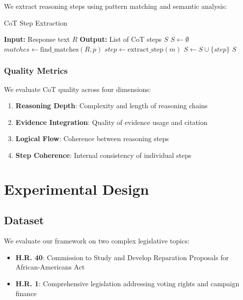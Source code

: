 \documentclass[11pt]{article}
\begin{document}
We extract reasoning steps using pattern matching and semantic analysis:

\begin{algorithm}
\caption{CoT Step Extraction}
\begin{algorithmic}[1]
\STATE \textbf{Input:} Response text $R$
\STATE \textbf{Output:} List of CoT steps $S$
\STATE $S \leftarrow \emptyset$
    \STATE $matches \leftarrow \text{find\_matches}(R, p)$
        \STATE $step \leftarrow \text{extract\_step}(m)$
        \STATE $S \leftarrow S \cup \{step\}$
    \ENDFOR
\ENDFOR
\RETURN $S$
\end{algorithmic}
\end{algorithm}

\subsubsection{Quality Metrics}

We evaluate CoT quality across four dimensions:

\begin{enumerate}
    \item \textbf{Reasoning Depth}: Complexity and length of reasoning chains
    \item \textbf{Evidence Integration}: Quality of evidence usage and citation
    \item \textbf{Logical Flow}: Coherence between reasoning steps
    \item \textbf{Step Coherence}: Internal consistency of individual steps
\end{enumerate}

\section{Experimental Design}

\subsection{Dataset}

We evaluate our framework on two complex legislative topics:
\begin{itemize}
    \item \textbf{H.R. 40}: Commission to Study and Develop Reparation Proposals for African-Americans Act
    \item \textbf{H.R. 1}: Comprehensive legislation addressing voting rights and campaign finance
\end{itemize}
\end{document}
